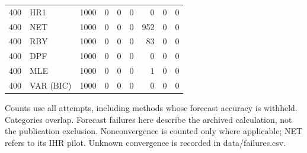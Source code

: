 \begin{table}[p]
{\begin{tabular}{llrrrrrrr}
400 & HR1 & 1000 & 0 & 0 & 0 & 0 & 0 & 0 \\
400 & NET & 1000 & 0 & 0 & 0 & 952 & 0 & 0 \\
400 & RBY & 1000 & 0 & 0 & 0 & 83 & 0 & 0 \\
400 & DPF & 1000 & 0 & 0 & 0 & 0 & 0 & 0 \\
400 & MLE & 1000 & 0 & 0 & 0 & 1 & 0 & 0 \\
400 & VAR (BIC) & 1000 & 0 & 0 & 0 & 0 & 0 & 0 \\
\bottomrule\end{tabular}}
\par\medskip
\begin{minipage}{\linewidth}\footnotesize Counts use all attempts, including methods whose forecast accuracy is withheld. Categories overlap. Forecast failures here describe the archived calculation, not the publication exclusion. Nonconvergence is counted only where applicable; NET refers to its IHR pilot. Unknown convergence is recorded in data/failures.csv. \end{minipage}
\end{table}
